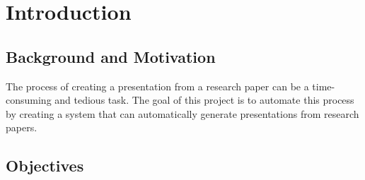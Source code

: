 
\chapter{Introduction}
\label{ch:intro}


\section{Background and Motivation}
\label{sec:intro:background}


The process of creating a presentation from a research paper can be a time-consuming and tedious task. The goal of this project is to automate this process by creating a system that can automatically generate presentations from research papers.


\section{Objectives}
\label{sec:intro:objectives}


